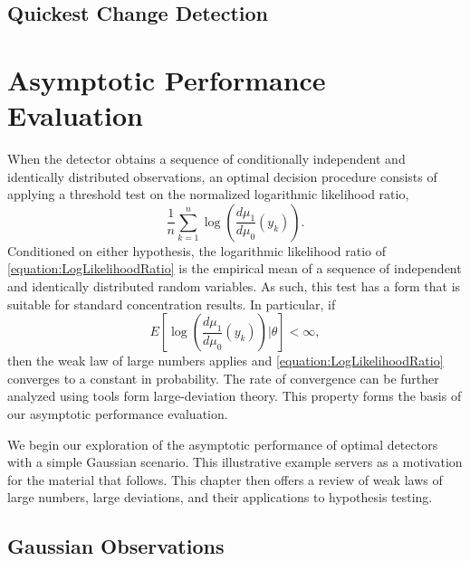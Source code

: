 \subsection{Quickest Change Detection}

\newpage

\section{Asymptotic Performance Evaluation}

When the detector obtains a sequence of conditionally independent and identically distributed observations, an optimal decision procedure consists of applying a threshold test on the normalized logarithmic likelihood ratio,
\begin{equation} \label{equation:LogLikelihoodRatio}
\frac{1}{n} \sum_{k=1}^n \log \left( \frac{d\mu_1}{d\mu_0}(y_k) \right) .
\end{equation}
Conditioned on either hypothesis, the logarithmic likelihood ratio of \eqref{equation:LogLikelihoodRatio} is the empirical mean of a sequence of independent and identically distributed random variables.
As such, this test has a form that is suitable for standard concentration results.
In particular, if
\begin{equation*}
E \left[ \log \left( \frac{d\mu_1}{d\mu_0}(y_k) \right) \Big| \theta \right] < \infty ,
\end{equation*}
then the weak law of large numbers applies and \eqref{equation:LogLikelihoodRatio} converges to a constant in probability.
The rate of convergence can be further analyzed using tools form large-deviation theory.
This property forms the basis of our asymptotic performance evaluation.

We begin our exploration of the asymptotic performance of optimal detectors with a simple Gaussian scenario.
This illustrative example servers as a motivation for the material that follows.
This chapter then offers a review of weak laws of large numbers, large deviations, and their applications to hypothesis testing.


\subsection{Gaussian Observations}

